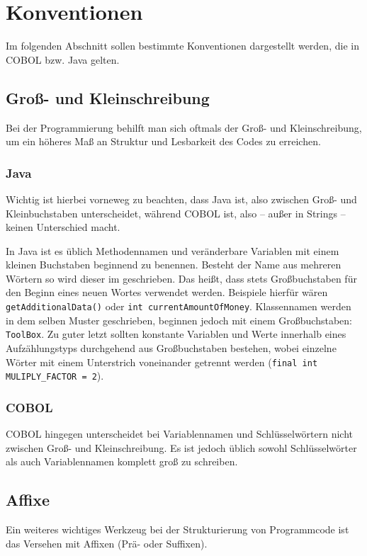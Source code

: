 \section{Konventionen}
Im folgenden Abschnitt sollen bestimmte Konventionen dargestellt werden, die in COBOL bzw. Java gelten.

\subsection*{Groß- und Kleinschreibung}
Bei der Programmierung behilft man sich oftmals der Groß- und Kleinschreibung, um ein höheres Maß an Struktur und Lesbarkeit des Codes zu erreichen. 

\subsubsection*{Java}

Wichtig ist hierbei vorneweg zu beachten, dass Java  ist, also zwischen Groß- und Kleinbuchstaben unterscheidet, während COBOL  ist, also -- außer in Strings -- keinen Unterschied macht.

In Java ist es üblich Methodennamen und veränderbare Variablen mit einem kleinen Buchstaben beginnend zu benennen. Besteht der Name aus mehreren Wörtern so wird dieser im  geschrieben. Das heißt, dass stets Großbuchstaben für den Beginn eines neuen Wortes verwendet werden. Beispiele hierfür wären \texttt{getAdditionalData()} oder \texttt{int currentAmountOfMoney}. Klassennamen werden in dem selben Muster geschrieben, beginnen jedoch mit einem Großbuchstaben: \texttt{ToolBox}. Zu guter letzt sollten konstante Variablen und Werte innerhalb eines Aufzählungstyps durchgehend aus Großbuchstaben bestehen, wobei einzelne Wörter mit einem Unterstrich voneinander getrennt werden (\texttt{final int MULIPLY_FACTOR = 2}). 

\subsubsection*{COBOL}
COBOL hingegen unterscheidet bei Variablennamen und Schlüsselwörtern nicht zwischen Groß- und Kleinschreibung. Es ist jedoch üblich sowohl Schlüsselwörter als auch Variablennamen komplett groß zu schreiben. 

\subsection*{Affixe}
Ein weiteres wichtiges Werkzeug bei der Strukturierung von Programmcode ist das Versehen mit Affixen (Prä- oder Suffixen).

